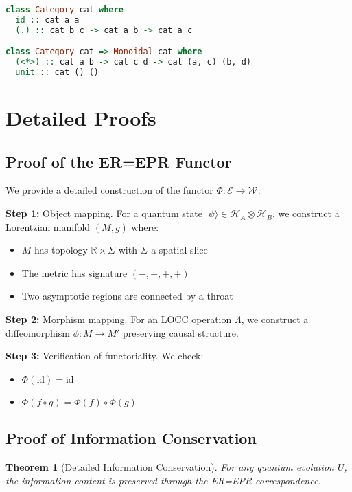 \documentclass[11pt,a4paper]{article}
\newtheorem{theorem}{Theorem}[section]
\newcommand{\id}{\text{id}}
\begin{document}
\begin{lstlisting}[language=Haskell]
class Category cat where
  id :: cat a a
  (.) :: cat b c -> cat a b -> cat a c

class Category cat => Monoidal cat where
  (<*>) :: cat a b -> cat c d -> cat (a, c) (b, d)
  unit :: cat () ()
\end{lstlisting}

\section{Detailed Proofs}

\subsection{Proof of the ER=EPR Functor}

We provide a detailed construction of the functor $\Phi: \mathcal{E} \to \mathcal{W}$:

\textbf{Step 1:} Object mapping. For a quantum state $|\psi\rangle \in \mathcal{H}_A \otimes \mathcal{H}_B$, we construct a Lorentzian manifold $(M, g)$ where:
\begin{itemize}
\item $M$ has topology $\mathbb{R} \times \Sigma$ with $\Sigma$ a spatial slice
\item The metric has signature $(-,+,+,+)$
\item Two asymptotic regions are connected by a throat
\end{itemize}

\textbf{Step 2:} Morphism mapping. For an LOCC operation $\Lambda$, we construct a diffeomorphism $\phi: M \to M'$ preserving causal structure.

\textbf{Step 3:} Verification of functoriality. We check:
\begin{itemize}
\item $\Phi(\id) = \id$
\item $\Phi(f \circ g) = \Phi(f) \circ \Phi(g)$
\end{itemize}

\subsection{Proof of Information Conservation}

\begin{theorem}[Detailed Information Conservation]
For any quantum evolution $U$, the information content is preserved through the ER=EPR correspondence.
\end{theorem}
\end{document}
